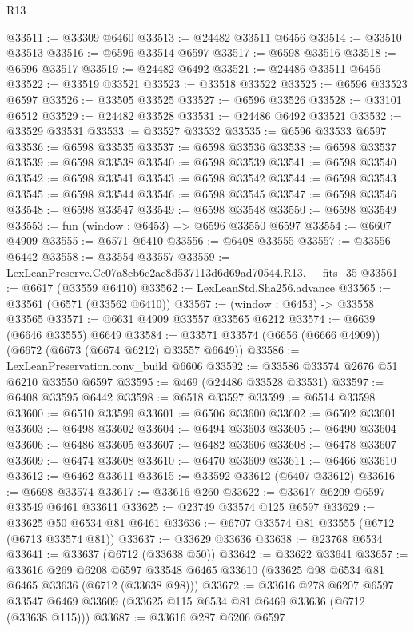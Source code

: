 \begin{lexlean}{R13}
\begin{coremodule}
@33511 := @33309 @6460
@33513 := @24482 @33511 @6456
@33514 := @33510 @33513
@33516 := @6596 @33514 @6597
@33517 := @6598 @33516
@33518 := @6596 @33517
@33519 := @24482 @6492
@33521 := @24486 @33511 @6456
@33522 := @33519 @33521
@33523 := @33518 @33522
@33525 := @6596 @33523 @6597
@33526 := @33505 @33525
@33527 := @6596 @33526
@33528 := @33101 @6512
@33529 := @24482 @33528
@33531 := @24486 @6492 @33521
@33532 := @33529 @33531
@33533 := @33527 @33532
@33535 := @6596 @33533 @6597
@33536 := @6598 @33535
@33537 := @6598 @33536
@33538 := @6598 @33537
@33539 := @6598 @33538
@33540 := @6598 @33539
@33541 := @6598 @33540
@33542 := @6598 @33541
@33543 := @6598 @33542
@33544 := @6598 @33543
@33545 := @6598 @33544
@33546 := @6598 @33545
@33547 := @6598 @33546
@33548 := @6598 @33547
@33549 := @6598 @33548
@33550 := @6598 @33549
@33553 := fun (window : @6453) => @6596 @33550 @6597
@33554 := @6607 @4909
@33555 := @6571 @6410
@33556 := @6408 @33555
@33557 := @33556 @6442
@33558 := @33554 @33557
@33559 := LexLeanPreserve.Cc07a8cb6c2ac8d537113d6d69ad70544.R13.__fits_35
@33561 := @6617 (@33559 @6410)
@33562 := LexLeanStd.Sha256.advance
@33565 := @33561 (@6571 (@33562 @6410))
@33567 := (window : @6453) -> @33558 @33565
@33571 := @6631 @4909 @33557 @33565 @6212
@33574 := @6639 (@6646 @33555) @6649
@33584 := @33571 @33574 (@6656 (@6666 @4909)) (@6672 (@6673 (@6674 @6212) @33557 @6649))
@33586 := LexLeanPreservation.conv_build @6606
@33592 := @33586 @33574 @2676 @51 @6210 @33550 @6597
@33595 := @469 (@24486 @33528 @33531)
@33597 := @6408 @33595 @6442
@33598 := @6518 @33597
@33599 := @6514 @33598
@33600 := @6510 @33599
@33601 := @6506 @33600
@33602 := @6502 @33601
@33603 := @6498 @33602
@33604 := @6494 @33603
@33605 := @6490 @33604
@33606 := @6486 @33605
@33607 := @6482 @33606
@33608 := @6478 @33607
@33609 := @6474 @33608
@33610 := @6470 @33609
@33611 := @6466 @33610
@33612 := @6462 @33611
@33615 := @33592 @33612 (@6407 @33612)
@33616 := @6698 @33574
@33617 := @33616 @260
@33622 := @33617 @6209 @6597 @33549 @6461 @33611
@33625 := @23749 @33574 @125 @6597
@33629 := @33625 @50 @6534 @81 @6461
@33636 := @6707 @33574 @81 @33555 (@6712 (@6713 @33574 @81))
@33637 := @33629 @33636
@33638 := @23768 @6534
@33641 := @33637 (@6712 (@33638 @50))
@33642 := @33622 @33641
@33657 := @33616
    @269
    @6208
    @6597
    @33548
    @6465
    @33610
    (@33625 @98 @6534 @81 @6465 @33636 (@6712 (@33638 @98)))
@33672 := @33616
    @278
    @6207
    @6597
    @33547
    @6469
    @33609
    (@33625 @115 @6534 @81 @6469 @33636 (@6712 (@33638 @115)))
@33687 := @33616
    @287
    @6206
    @6597

\end{coremodule}
\end{lexlean}
